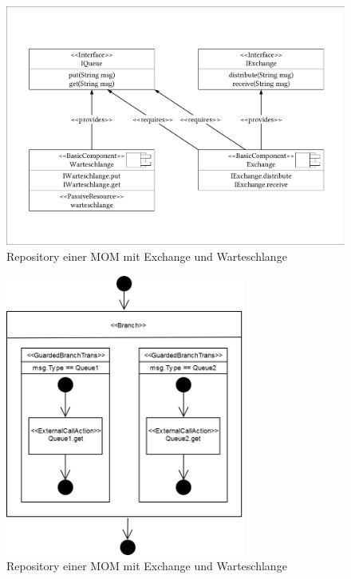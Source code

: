 \begin{figure}
\center
  \includegraphics[width=1\textwidth]{images/modelling/repository.pdf}
  \caption{Repository einer MOM mit Exchange und Warteschlange}
  \label{img:mom_repository}
\end{figure}

\begin{figure}
\center
  \includegraphics[width=0.7\textwidth]{images/modelling/branchSeff.png}
  \caption{Repository einer MOM mit Exchange und Warteschlange}
  \label{img:queueBranch}
\end{figure}

